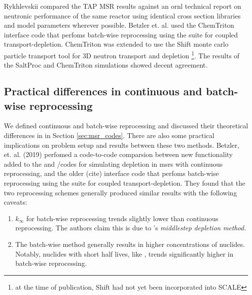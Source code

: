 
Rykhlevskii compared the TAP MSR results against an \Gls{ornl} technical report on neutronic performance of the same reactor\cite{betzler_assessment_2017} using identical cross section libraries and model parameters wherever possible. Betzler et. al. used the ChemTriton\cite{betzler_molten_2017} interface code that perfoms batch-wise reprocessing using
the \SCALE suite for coupled transport-depletion. ChemTriton was extended to use the Shift\cite{davidson_nuclide_2018} monte carlo particle transport tool for 3D neutron transport and depletion \footnote{at the time of publication, Shift had not yet been incorporated into SCALE}. The results of the SaltProc and ChemTriton simulations showed decent agreement.


\subsection{Practical differences in continuous and batch-wise reprocessing}
We defined continuous and batch-wise reprocessing and discussed their
theoretical differences in in Section \ref{sec:msr_codes}. There are also some
practical implications on problem setup and results between these two methods.
Betzler, et. al. (2019) \cite{betzler_molten_2019} perfomed a code-to-code
comparsion between new functionality added to the \ORIGEN and \SCALE/\TRITON codes
for simulating depletion in \Gls{msr}s with continuous reprocessing, and the
older \ChemTriton(cite) interface code that perfoms batch-wise reprocessing using
the \SCALE suite for coupled transport-depletion. They found that the two
reprocessing schemes generally produced similar results with the following
caveats:
\begin{enumerate}
    \item $k_{\infty}$ for batch-wise reprocessing trends slightly lower than  continuous reprocessing. The authors claim this is due to \ChemTriton's \it{middlestep depletion method}. 
    \item The batch-wise method generally results in higher concentrations of nuclides. Notably, nuclides with short half lives, like , trends significantly higher in batch-wise reprocessing.
\end{enumerate}


